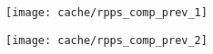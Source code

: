 




\begin{figure}[H]
\center
\texttt{[image: cache/rpps\_comp\_prev\_1]}
\end{figure}

\begin{figure}[H]
\center
\texttt{[image: cache/rpps\_comp\_prev\_2]}
\end{figure}

